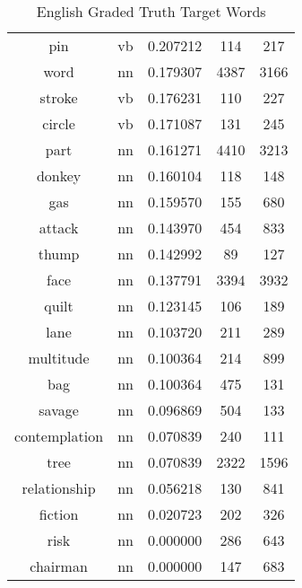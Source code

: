 \begin{table}
\begin{tabular}{ccccc}
pin              & vb            & 0.207212                 & 114                & 217                 \\
word             & nn            & 0.179307                 & 4387               & 3166                \\
stroke           & vb            & 0.176231                 & 110                & 227                 \\
circle           & vb            & 0.171087                 & 131                & 245                 \\
part             & nn            & 0.161271                 & 4410               & 3213                \\
donkey           & nn            & 0.160104                 & 118                & 148                 \\
gas              & nn            & 0.159570                 & 155                & 680                 \\
attack           & nn            & 0.143970                 & 454                & 833                 \\
thump            & nn            & 0.142992                 & 89                 & 127                 \\
face             & nn            & 0.137791                 & 3394               & 3932                \\
quilt            & nn            & 0.123145                 & 106                & 189                 \\
lane             & nn            & 0.103720                 & 211                & 289                 \\
multitude        & nn            & 0.100364                 & 214                & 899                 \\
bag              & nn            & 0.100364                 & 475                & 131                 \\
savage           & nn            & 0.096869                 & 504                & 133                 \\
contemplation    & nn            & 0.070839                 & 240                & 111                 \\
tree             & nn            & 0.070839                 & 2322               & 1596                \\
relationship     & nn            & 0.056218                 & 130                & 841                 \\
fiction          & nn            & 0.020723                 & 202                & 326                 \\
risk             & nn            & 0.000000                 & 286                & 643                 \\
chairman         & nn            & 0.000000                 & 147                & 683                 \\
\bottomrule
\end{tabular}
\caption{English Graded Truth Target Words}
\label{tab:eng-truthtargets}
\end{table}



